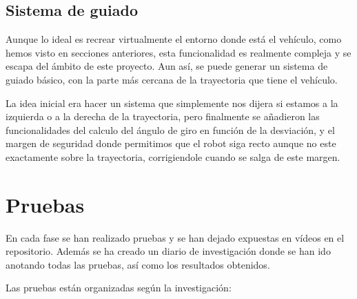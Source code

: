 \subsection{Sistema de guiado}
Aunque lo ideal es recrear virtualmente el entorno donde está el vehículo, como hemos visto en secciones anteriores, esta funcionalidad es realmente compleja y se escapa del ámbito de este proyecto. Aun así, se puede generar un sistema de guiado básico, con la parte más cercana de la trayectoria que tiene el vehículo. 

La idea inicial era hacer un sistema que simplemente nos dijera si estamos a la izquierda o a la derecha de la trayectoria, pero finalmente se añadieron las funcionalidades del calculo del ángulo de giro en función de la desviación, y el margen de seguridad donde permitimos que el robot siga recto aunque no este exactamente sobre la trayectoria, corrigiendole cuando se salga de este margen.

\section{Pruebas}
En cada fase se han realizado pruebas y se han dejado expuestas en vídeos en el repositorio\cite{videos}. Además se ha creado un diario de investigación donde se han ido anotando todas las pruebas, así como los resultados obtenidos\cite{diario}.

Las pruebas están organizadas según la investigación:

